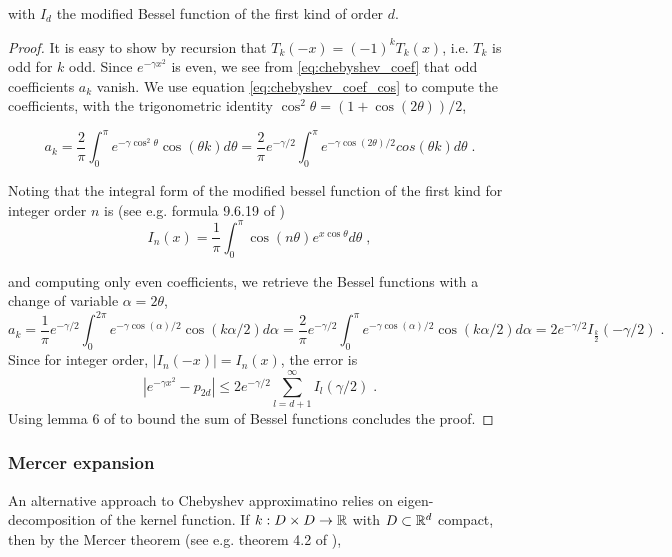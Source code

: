 \documentclass{article}
\begin{document}
{\begin{lemma}
with $I_d$ the modified Bessel function of the first kind of order $d$.
\end{lemma}
\begin{proof}
It is easy to show by recursion that $T_k(-x) = (-1)^k T_k(x)$, i.e. $T_k$ is odd for $k$ odd. Since $e^{-\gamma x^2}$ is even, we see from \eqref{eq:chebyshev_coef} that odd coefficients $a_k$ vanish. We use equation \eqref{eq:chebyshev_coef_cos} to compute the coefficients, with the trigonometric identity $\cos^2\theta = (1 + \cos(2\theta))/2$,

\begin{equation*}
    a_k = \frac{2}{\pi} \int_0^\pi e^{-\gamma \cos^2 \theta} \cos(\theta k) d\theta = \frac{2}{\pi} e^{-\gamma / 2} \int_0^\pi e^{-\gamma \cos(2\theta) / 2} cos(\theta k) d\theta \; .
\end{equation*}

Noting that the integral form of the modified bessel function of the first kind for integer order $n$ is (see e.g. formula 9.6.19 of \cite{abramowitz_handbook_1972})
\begin{equation*}
    I_n(x) = \frac{1}{\pi} \int_0^\pi \cos(n\theta) e^{x\cos\theta} d\theta \; ,
\end{equation*}

and computing only even coefficients, we retrieve the Bessel functions with a change of variable $\alpha=2\theta$,
\begin{equation*}
    a_k = \frac{1}{\pi} e^{-\gamma /2} \int_0^{2\pi} e^{-\gamma \cos( \alpha)/2} \cos(k\alpha / 2) d\alpha 
    = \frac{2}{\pi} e^{-\gamma /2} \int_0^{\pi} e^{-\gamma \cos( \alpha)/2} \cos(k\alpha / 2) d\alpha = 2 e^{-\gamma/2} I_{\frac{k}{2}}(-\gamma/2) \; .
\end{equation*}
Since for integer order, $|I_n(-x)| = I_n(x)$, the error is 
\begin{equation*}
    |e^{-\gamma x^2 } - p_{2d} |\le 2 e^{-\gamma/2} \sum_{l=d+1}^\infty I_{l}(\gamma / 2) \; .
\end{equation*}
Using lemma 6 of \cite{gardner_gpytorch_2021} to bound the sum of Bessel functions concludes the proof. 
\end{proof}


\subsubsection{Mercer expansion}

An alternative approach to Chebyshev approximatino relies on eigen-decomposition of the kernel function. If $k: D \times D \to \mathbb R$ with $D \subset \mathbb R^d$ compact, then by the Mercer theorem (see e.g. theorem 4.2 of \cite{rasmussen_gaussian_2005}),

}
\end{document}
